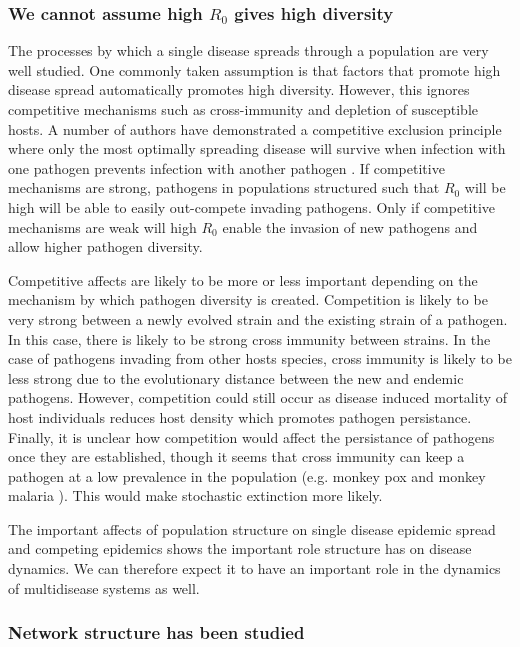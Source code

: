 \subsubsection{We cannot assume high $R_0$ gives high diversity}
The processes by which a single disease spreads through a population are very well studied.
One commonly taken assumption is that factors that promote high disease spread automatically promotes high diversity.
However, this ignores competitive mechanisms such as cross-immunity and depletion of susceptible hosts.
A number of authors have demonstrated a competitive exclusion principle where only the most optimally spreading disease will survive when infection with one pathogen prevents infection with another pathogen \cite{bremermann1989competitive, martcheva2013competitive, ackleh2003competitive, ackleh2014robust, turner2002impact}.
If competitive mechanisms are strong, pathogens in populations structured such that $R_0$ will be high will be able to easily out-compete invading pathogens.
Only if competitive mechanisms are weak will high $R_0$  enable the invasion of new pathogens and allow higher pathogen diversity.

Competitive affects are likely to be more or less important depending on the mechanism by which pathogen diversity is created.
Competition is likely to be very strong between a newly evolved strain and the existing strain of a pathogen. 
In this case, there is likely to be strong cross immunity between strains.
In the case of pathogens invading from other hosts species, cross immunity is likely to be less strong due to the evolutionary distance between the new and endemic pathogens.
However, competition could still occur as disease induced mortality of host individuals reduces host density which promotes pathogen persistance.
Finally, it is unclear how competition would affect the persistance of pathogens once they are established, though it seems that cross immunity can keep a pathogen at a low prevalence in the population (e.g. monkey pox \cite{rimoin2010major} and monkey malaria \cite{cox2008knowlesi}). 
This would make stochastic extinction more likely.

The important affects of population structure on single disease epidemic spread and competing epidemics shows the important role structure has on disease dynamics.
We can therefore expect it to have an important role in the dynamics of multidisease systems as well.

\subsubsection{Network structure has been studied}
 
